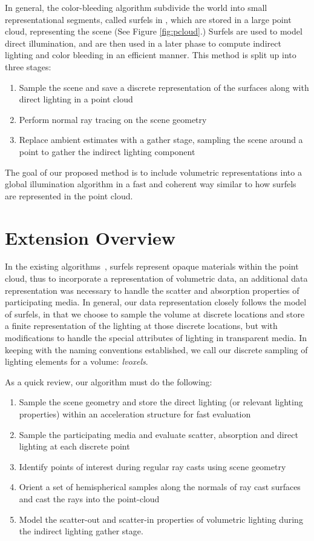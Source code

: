 \documentclass[12pt]{ucthesis}
\begin{document}
In general, the color-bleeding algorithm subdivide the world into small representational segments, called surfels in \cite{christensen:2008}, which are stored in a large point cloud, representing the scene (See Figure \ref{fig:pcloud}.)  Surfels are used to model direct illumination, and are then used in a later phase to compute indirect lighting and color bleeding in an efficient manner.  This method is split up into three stages:

\begin{enumerate}
\item Sample the scene and save a discrete representation of the surfaces along with direct lighting in a point cloud
\item Perform normal ray tracing on the scene geometry
\item Replace ambient estimates with a gather stage, sampling the scene around a point to gather the indirect lighting component
\end{enumerate}

The goal of our proposed method is to include volumetric representations into a global illumination algorithm in a fast and coherent way similar to how surfels are represented in the point cloud.

\section{Extension Overview}

In the existing algorithms~\cite{christensen:2008}, surfels represent opaque materials within the point cloud, thus to incorporate a representation of volumetric data, an additional data representation was necessary to handle the scatter and absorption properties of participating media.  In general, our data representation closely follows the model of surfels, in that we choose to sample the volume at discrete locations and store a finite representation of the lighting at those discrete locations, but with modifications to handle the special attributes of lighting in transparent media.  In keeping with the naming conventions established, we call our discrete sampling of lighting elements for a volume: \emph{lvoxels}.  

As a quick review, our algorithm must do the following:
\begin{enumerate}
\item Sample the scene geometry and store the direct lighting (or relevant lighting properties) within an acceleration structure for fast evaluation
\item Sample the participating media and evaluate scatter, absorption and direct lighting at each discrete point
\item Identify points of interest during regular ray casts using scene geometry 
\item Orient a set of hemispherical samples along the normals of ray cast surfaces and cast the rays into the point-cloud
\item Model the scatter-out and scatter-in properties of volumetric lighting during the indirect lighting gather stage.
\end{enumerate}
\end{document}
